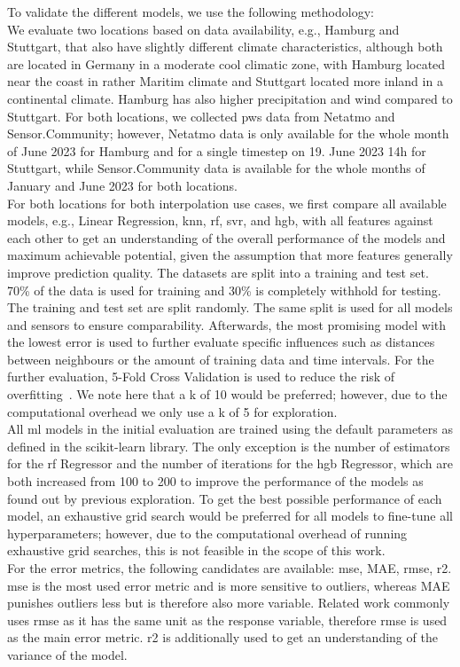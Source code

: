 To validate the different models, we use the following methodology:\\
We evaluate two locations based on data availability, e.g., Hamburg and Stuttgart, that also have slightly different climate characteristics, although both are located in Germany in a moderate cool climatic zone, with Hamburg located near the coast in rather Maritim climate and Stuttgart located more inland in a continental climate. Hamburg has also higher precipitation and wind compared to Stuttgart.
For both locations, we collected \gls{pws} data from Netatmo and Sensor.Community; however, Netatmo data is only available for the whole month of June 2023 for Hamburg and for a single timestep on 19. June 2023 14h for Stuttgart, while Sensor.Community data is available for the whole months of January and June 2023 for both locations.\\
For both locations for both interpolation use cases, we first compare all available models, e.g., Linear Regression, \gls{knn}, \gls{rf}, \gls{svr}, and \gls{hgb}, with all features against each other to get an understanding of the overall performance of the models and maximum achievable potential, given the assumption that more features generally improve prediction quality. The datasets are split into a training and test set. 70\% of the data is used for training and 30\% is completely withhold for testing. The training and test set are split randomly. The same split is used for all models and sensors to ensure comparability.
Afterwards, the most promising model with the lowest error is used to further evaluate specific influences such as distances between neighbours or the amount of training data and time intervals. For the further evaluation, 5-Fold Cross Validation is used to reduce the risk of overfitting~\cite{kohavi1995study}. We note here that a k of 10 would be preferred; however, due to the computational overhead we only use a k of 5 for exploration.\\
All \gls{ml} models in the initial evaluation are trained using the default parameters as defined in the scikit-learn library. The only exception is the number of estimators for the \gls{rf} Regressor and the number of iterations for the \gls{hgb} Regressor, which are both increased from 100 to 200 to improve the performance of the models as found out by previous exploration. To get the best possible performance of each model, an exhaustive grid search would be preferred for all models to fine-tune all hyperparameters; however, due to the computational overhead of running exhaustive grid searches, this is not feasible in the scope of this work.\\
For the error metrics, the following candidates are available: \gls{mse}, MAE, \gls{rmse}, \gls{r2}. \gls{mse} is the most used error metric and is more sensitive to outliers, whereas MAE punishes outliers less but is therefore also more variable. Related work commonly uses \gls{rmse} as it has the same unit as the response variable, therefore \gls{rmse} is used as the main error metric. \gls{r2} is additionally used to get an understanding of the variance of the model.

